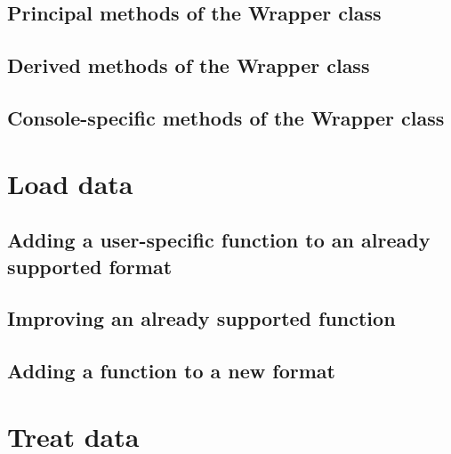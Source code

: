\documentclass{book}
\begin{document}
        \section{Principal methods of the Wrapper class}
            

        \section{Derived methods of the Wrapper class}
            

        \section{Console-specific methods of the Wrapper class}
            

        

    \chapter{Load data} \label{sec:load_data}
        
        \section{Adding a user-specific function to an already supported format} \label{subsec:load_data.user_specific}
            

        \section{Improving an already supported function} \label{subsec:load_data.improvement}
            

        \section{Adding a function to a new format} \label{subsec:load_data.new_format}
            
            
    \chapter{Treat data} \label{sec:treatment}
        
\end{document}

